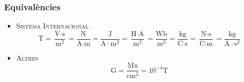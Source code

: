 \documentclass[11pt]{article}
\begin{document}
        \subsubsection*{Equivalències}
            \begin{itemize}
                \item \textsc{Sistema Internacional}
                \[\si{\tesla}=\frac{\si{\volt}\cdot\si{\second}}{\si{\meter}^2} = 
                \frac{\si{\newton}}{\si{\ampere}\cdot\si{\meter}} = 
                \frac{\si{\joule}}{\si{\ampere}\cdot\si{\meter}^2} = 
                \frac{\si{\henry}\cdot\si{\ampere}}{\si{\meter}^2} = 
                \frac{\si{\weber}}{\si{\meter}^2} = 
                \frac{\si{\kilogram}}{\si{\coulomb}\cdot\si{\second}} = 
                \frac{\si{\newton}\cdot\si{\second}}{\si{\coulomb}\cdot\si{\meter}} = 
                \frac{\si{\kilogram}}{\si{\ampere}\cdot\si{\second}^2}
                \]
                \item \textsc{Altres}
                \[\text{G}=\frac{\text{Mx}}{\text{cm}^2}=10^{-4}\si{\tesla}\]
            \end{itemize}
        \clearpage
        
\end{document}
